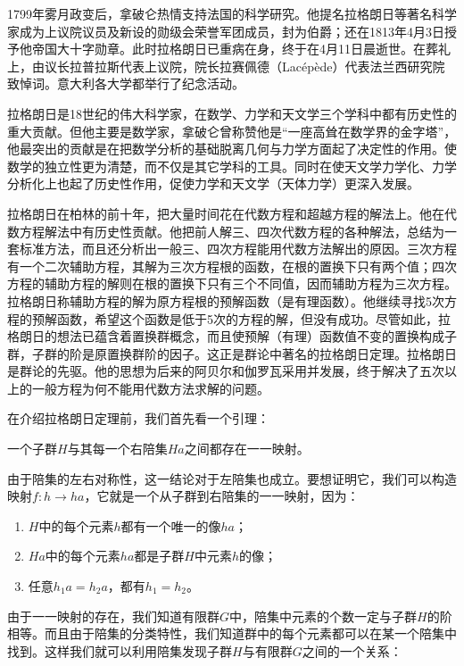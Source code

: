 \documentclass[b5paper]{ctexart}
\begin{document}
1799年雾月政变后，拿破仑热情支持法国的科学研究。他提名拉格朗日等著名科学家成为上议院议员及新设的勋级会荣誉军团成员，封为伯爵；还在1813年4月3日授予他帝国大十字勋章。此时拉格朗日已重病在身，终于在4月11日晨逝世。在葬礼上，由议长拉普拉斯代表上议院，院长拉赛佩德（Lacépède）代表法兰西研究院致悼词。意大利各大学都举行了纪念活动。

拉格朗日是18世纪的伟大科学家，在数学、力学和天文学三个学科中都有历史性的重大贡献。但他主要是数学家，拿破仑曾称赞他是“一座高耸在数学界的金字塔”，他最突出的贡献是在把数学分析的基础脱离几何与力学方面起了决定性的作用。使数学的独立性更为清楚，而不仅是其它学科的工具。同时在使天文学力学化、力学分析化上也起了历史性作用，促使力学和天文学（天体力学）更深入发展。

拉格朗日在柏林的前十年，把大量时间花在代数方程和超越方程的解法上。他在代数方程解法中有历史性贡献。他把前人解三、四次代数方程的各种解法，总结为一套标准方法，而且还分析出一般三、四次方程能用代数方法解出的原因。三次方程有一个二次辅助方程，其解为三次方程根的函数，在根的置换下只有两个值；四次方程的辅助方程的解则在根的置换下只有三个不同值，因而辅助方程为三次方程。拉格朗日称辅助方程的解为原方程根的预解函数（是有理函数）。他继续寻找5次方程的预解函数，希望这个函数是低于5次的方程的解，但没有成功。尽管如此，拉格朗日的想法已蕴含着置换群概念，而且使预解（有理）函数值不变的置换构成子群，子群的阶是原置换群阶的因子。这正是群论中著名的拉格朗日定理。拉格朗日是群论的先驱。他的思想为后来的阿贝尔和伽罗瓦采用并发展，终于解决了五次以上的一般方程为何不能用代数方法求解的问题。

在介绍拉格朗日定理前，我们首先看一个引理：

\begin{lemma}
一个子群$H$与其每一个右陪集$Ha$之间都存在一一映射。
\end{lemma}

由于陪集的左右对称性，这一结论对于左陪集也成立。要想证明它，我们可以构造映射$f: h \to ha$，它就是一个从子群到右陪集的一一映射，因为：

\begin{enumerate}
\item $H$中的每个元素$h$都有一个唯一的像$ha$；
\item $Ha$中的每个元素$ha$都是子群$H$中元素$h$的像；
\item 任意$h_1a = h_2a$，都有$h_1 = h_2$。
\end{enumerate}

由于一一映射的存在，我们知道有限群$G$中，陪集中元素的个数一定与子群$H$的阶相等。而且由于陪集的分类特性，我们知道群中的每个元素都可以在某一个陪集中找到。这样我们就可以利用陪集发现子群$H$与有限群$G$之间的一个关系：
\end{document}
